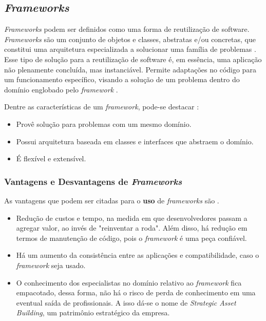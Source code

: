\subsection{\textit{Frameworks}}
\textit{Frameworks} podem ser definidos como uma forma de reutilização de software. \textit{Frameworks} são um conjunto de objetos e classes, abstratas e/ou concretas, que constitui uma arquitetura especializada a solucionar uma família de problemas \cite{barretoJunior2006}. Esse tipo de solução para a reutilização de software é, em essência, uma aplicação não plenamente concluída, mas instanciável. Permite adaptações no código para um funcionamento específico, visando a solução de um problema dentro do domínio englobado pelo \textit{framework} \cite{barretoJunior2006}.
\par
\indent Dentre as características de um \textit{framework}, pode-se destacar \cite{sauve2006}:
\begin{itemize}
\item Provê solução para problemas com um mesmo domínio.
\item Possui arquitetura baseada em classes e interfaces que abstraem o domínio.
\item É flexível e extensível.
\end{itemize}
\par
\subsubsection{Vantagens e Desvantagens de \textit{Frameworks}}
As vantagens que podem ser citadas para o \textbf{uso} de \textit{frameworks} são \cite{barretoJunior2006} \cite{sauve2006}.
\begin{itemize}
\item Redução de custos e tempo, na medida em que desenvolvedores passam a agregar valor, ao invés de "reinventar a roda". Além disso, há redução em termos de manutenção de código, pois o \textit{framework} é uma peça confiável.
\item Há um aumento da consistência entre as aplicações e compatibilidade, caso o \textit{framework} seja usado.
\item O conhecimento dos especialistas no domínio relativo ao \textit{framework} fica empacotado, dessa forma, não há o risco de perda de conhecimento em uma eventual saída de profissionais. A isso dá-se o nome de \textit{Strategic Asset Building}, um patrimônio estratégico da empresa.
\end{itemize}

